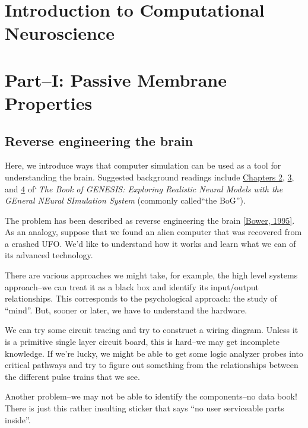 \documentclass[12pt]{article}
\begin{document}
\section*{Introduction to Computational Neuroscience}
\section*{Part--I: Passive Membrane Properties}

\subsection*{Reverse engineering the brain}

Here, we introduce ways that computer simulation can be used as a tool for understanding the brain. Suggested background readings include \href{../bog-ch2/bog-ch2.pdf}{Chapters 2}, \href{../bog-ch3/bog-ch3.pdf}{3}, and \href{../bog-ch4/bog-ch4.pdf}{4} of`{\it\,The Book of GENESIS: Exploring Realistic Neural Models with the GEneral NEural SImulation System} (commonly called``the BoG''). 

The problem has been described as reverse engineering the brain \ref{Bower, 1995}. As an analogy, suppose that we found an alien computer that was recovered from a crashed UFO. We'd like to understand how it works and learn what we can of its advanced technology.

There are various approaches we might take, for example, the high level systems approach--we can treat it as a black box and identify its input/output relationships. This corresponds to the psychological approach: the study of ``mind''. But, sooner or later, we have to understand the hardware.

We can try some circuit tracing and try to construct a wiring diagram. Unless it is a primitive single layer circuit board, this is hard--we may get incomplete knowledge. If we're lucky, we might be able to get some logic analyzer probes into critical pathways and try to figure out something from the relationships between the different pulse trains that we see.

Another problem--we may not be able to identify the components--no data book! There is just this rather insulting sticker that says ``no user serviceable parts inside''.
\end{document}

